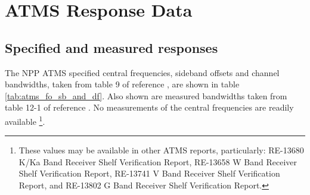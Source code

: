 \section{ATMS Response Data}

\subsection{Specified and measured responses}
The NPP ATMS specified central frequencies, sideband offsets and channel bandwidths, taken from table 9 of reference \cite{CrIS_EDR_ATBD}, are shown in table \ref{tab:atms_fo_sb_and_df}. Also shown are measured bandwidths taken from table 12-1 of reference \cite{ATMS_PFM_CalLog}. No measurements of the central frequencies are readily available \footnote{These values may be available in other ATMS reports, particularly: RE-13680 K/Ka Band Receiver Shelf Verification Report, RE-13658 W Band Receiver Shelf Verification Report, RE-13741 V Band Receiver Shelf Verification Report, and RE-13802 G Band Receiver Shelf Verification Report.}.

